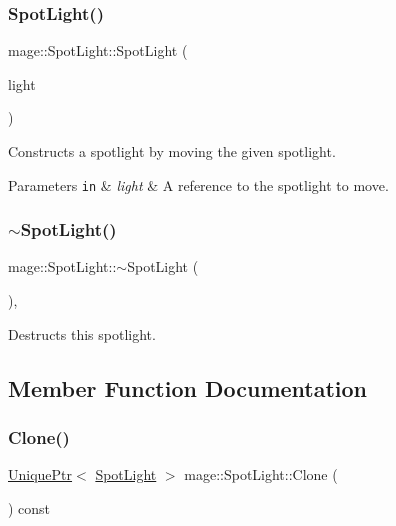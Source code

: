 \subsubsection{\texorpdfstring{Spot\+Light()}{SpotLight()}\hspace{0.1cm}{\footnotesize\ttfamily [3/3]}}
{\footnotesize\ttfamily mage\+::\+Spot\+Light\+::\+Spot\+Light (\begin{DoxyParamCaption}\item[{\hyperlink{classmage_1_1_spot_light}{Spot\+Light} \&\&}]{light }\end{DoxyParamCaption})\hspace{0.3cm}{\ttfamily [default]}}

Constructs a spotlight by moving the given spotlight.


\begin{DoxyParams}[1]{Parameters}
\mbox{\tt in}  & {\em light} & A reference to the spotlight to move. \\
\hline
\end{DoxyParams}
\hypertarget{classmage_1_1_spot_light_aeeaba91c6448102ac6a23587c5366808}{}\label{classmage_1_1_spot_light_aeeaba91c6448102ac6a23587c5366808} 
\subsubsection{\texorpdfstring{$\sim$\+Spot\+Light()}{~SpotLight()}}
{\footnotesize\ttfamily mage\+::\+Spot\+Light\+::$\sim$\+Spot\+Light (\begin{DoxyParamCaption}{ }\end{DoxyParamCaption})\hspace{0.3cm}{\ttfamily [virtual]}, {\ttfamily [default]}}

Destructs this spotlight. 

\subsection{Member Function Documentation}
\hypertarget{classmage_1_1_spot_light_a1092a1238be8cfd771a43e6976d16270}{}\label{classmage_1_1_spot_light_a1092a1238be8cfd771a43e6976d16270} 
\subsubsection{\texorpdfstring{Clone()}{Clone()}}
{\footnotesize\ttfamily \hyperlink{namespacemage_a8c307fbcc33bce9b7f2aa4c26c3b95cf}{Unique\+Ptr}$<$ \hyperlink{classmage_1_1_spot_light}{Spot\+Light} $>$ mage\+::\+Spot\+Light\+::\+Clone (\begin{DoxyParamCaption}{ }\end{DoxyParamCaption}) const}

